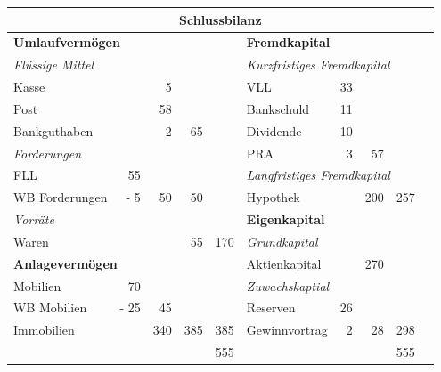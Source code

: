 \documentclass{standalone}
\begin{document}
\begin{tabular}{lrrrr|lrrrr}
    \multicolumn{10}{c}{\textbf{Schlussbilanz}}\\
    \toprule
    \multicolumn{5}{l|}{\textbf{Umlaufvermögen}}&
    \multicolumn{5}{l}{\textbf{Fremdkapital}}\\
    \multicolumn{5}{l|}{\textit{Flüssige Mittel}}&
    \multicolumn{5}{l}{\textit{Kurzfristiges Fremdkapital}}\\
    Kasse&&5&&&VLL&33&&&\\
    Post&&58&&&Bankschuld&11&&&\\
    Bankguthaben&&2&65&&Dividende&10&&&\\
    \multicolumn{5}{l|}{\textit{Forderungen}}&
    PRA&3&57&&\\
    FLL&55&&&&\multicolumn{5}{l}{\textit{Langfristiges Fremdkapital}}\\
    WB Forderungen&- 5&50&50&&Hypothek&&200&257&\\
    \multicolumn{5}{l|}{\textit{Vorräte}}&
    \multicolumn{5}{l}{\textbf{Eigenkapital}}\\
    Waren&&&55&170&
    \multicolumn{5}{l}{\textit{Grundkapital}}\\
    \multicolumn{5}{l|}{\textbf{Anlagevermögen}}&
    Aktienkapital&&270&&\\
    Mobilien&70&&&&
    \multicolumn{5}{l}{\textit{Zuwachskaptial}}\\
    WB Mobilien&- 25&45&&&Reserven&26&&&\\
    Immobilien&&340&385&385&Gewinnvortrag&2&28&298&\\
    \midrule
    &&&&555&&&&555\\
    \bottomrule
\end{tabular}
\end{document}
